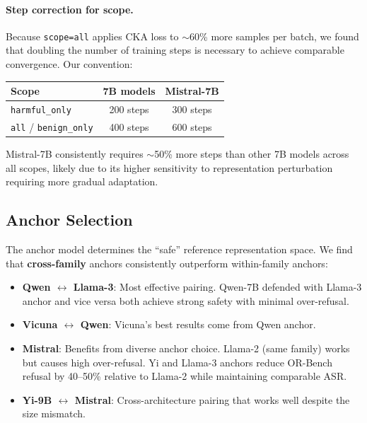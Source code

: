 \paragraph{Step correction for scope.} Because \texttt{scope=all} applies CKA loss to $\sim$60\% more samples per batch, we found that doubling the number of training steps is necessary to achieve comparable convergence. Our convention:

\begin{center}
\begin{tabular}{lcc}
\toprule
\textbf{Scope} & \textbf{7B models} & \textbf{Mistral-7B} \\
\midrule
\texttt{harmful\_only} & 200 steps & 300 steps \\
\texttt{all} / \texttt{benign\_only} & 400 steps & 600 steps \\
\bottomrule
\end{tabular}
\end{center}

\noindent Mistral-7B consistently requires $\sim$50\% more steps than other 7B models across all scopes, likely due to its higher sensitivity to representation perturbation requiring more gradual adaptation.

\subsection{Anchor Selection}
\label{app:hyperparams:anchor}

The anchor model determines the ``safe'' reference representation space. We find that \textbf{cross-family} anchors consistently outperform within-family anchors:

\begin{itemize}[nosep,leftmargin=*]
    \item \textbf{Qwen $\leftrightarrow$ Llama-3}: Most effective pairing. Qwen-7B defended with Llama-3 anchor and vice versa both achieve strong safety with minimal over-refusal.
    \item \textbf{Vicuna $\leftrightarrow$ Qwen}: Vicuna's best results come from Qwen anchor.
    \item \textbf{Mistral}: Benefits from diverse anchor choice. Llama-2 (same family) works but causes high over-refusal. Yi and Llama-3 anchors reduce OR-Bench refusal by 40--50\% relative to Llama-2 while maintaining comparable ASR.
    \item \textbf{Yi-9B $\leftrightarrow$ Mistral}: Cross-architecture pairing that works well despite the size mismatch.
\end{itemize}

